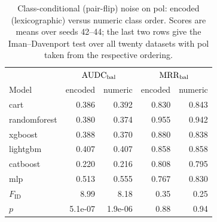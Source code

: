 \begin{table}[htbp]
\centering\small
\caption{Class-conditional (pair-flip) noise on pol: encoded (lexicographic) versus numeric class order. Scores are means over seeds 42--44; the last two rows give the Iman--Davenport test over all twenty datasets with pol taken from the respective ordering.}\label{tab:pol_ordering}
\begin{tabular}{@{}lrrrr@{}}
\toprule
 & \multicolumn{2}{c}{$\mathrm{AUDC}_{\mathrm{bal}}$} & \multicolumn{2}{c}{$\mathrm{MRR}_{\mathrm{bal}}$} \\
Model & encoded & numeric & encoded & numeric \\
\midrule
cart & 0.386 & 0.392 & 0.830 & 0.843 \\
randomforest & 0.380 & 0.374 & 0.955 & 0.942 \\
xgboost & 0.388 & 0.370 & 0.880 & 0.838 \\
lightgbm & 0.407 & 0.407 & 0.858 & 0.858 \\
catboost & 0.220 & 0.216 & 0.808 & 0.795 \\
mlp & 0.513 & 0.555 & 0.767 & 0.830 \\
\midrule
$F_{\mathrm{ID}}$ & 8.99 & 8.18 & 0.35 & 0.25 \\
$p$ & 5.1e-07 & 1.9e-06 & 0.88 & 0.94 \\
\bottomrule
\end{tabular}
\end{table}
